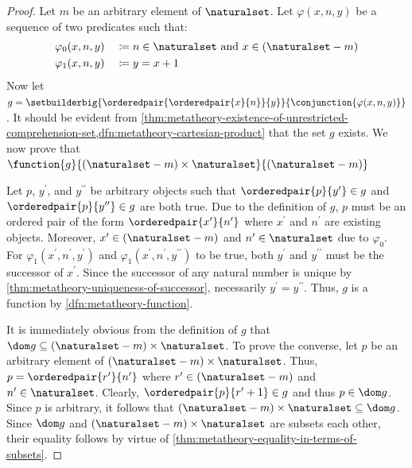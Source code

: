 \begin{proof}
    Let \( m \) be an arbitrary element of \( \naturalset \).
    Let \( \varphi(x, n, y) \) be a sequence of two predicates such that:
    \begin{alignat*}{2}
        &\varphi_{0}(x, n, y) &&\coloneq \text{\( n \in \naturalset \) and \( x \in \mleft( \naturalset - m \mright) \)}\\
        &\varphi_{1}(x, n, y) &&\coloneq \text{\( y = x + 1 \)}
    \end{alignat*}
    Now let \( g = \setbuilderbig{\orderedpair{\orderedpair{x}{n}}{y}}{\conjunction{\varphi(x, n, y)}} \).
    It should be evident from \cref{thm:metatheory-existence-of-unrestricted-comprehension-set,dfn:metatheory-cartesian-product}
    that the set \( g \) exists.
    We now prove that \( \function{g}{\mleft( \naturalset - m \mright) \times \naturalset}{\mleft( \naturalset - m \mright)} \)

    \vspace{0.3cm}
    \noindent
    Let \( p \), \( y^{\prime} \), and \( y^{\prime\prime} \) be arbitrary objects such that
    \( \orderedpair{p}{y^{\prime}} \in g \) and \( \orderedpair{p}{y^{\prime\prime}} \in g \) are both true.
    Due to the definition of \( g \), \( p \) must be an ordered pair of the form \( \orderedpair{x^{\prime}}{n^{\prime}} \)
    where \( x^{\prime} \) and \( n^{\prime} \) are existing objects.
    Moreover, \( x^{\prime} \in \mleft( \naturalset - m \mright) \) and \( n^{\prime} \in \naturalset \) due to \( \varphi_{0} \).
    For \( \varphi_{1}(x^{\prime}, n^{\prime}, y^{\prime}) \)
    and \( \varphi_{1}(x^{\prime}, n^{\prime}, y^{\prime\prime}) \) to be true,
    both \( y^{\prime} \) and \( y^{\prime\prime} \) must be the successor of \( x^{\prime} \).
    Since the successor of any natural number is unique by \cref{thm:metatheory-uniqueness-of-successor}, necessarily \( y^{\prime} = y^{\prime\prime} \).
    Thus, \( g \) is a function by \cref{dfn:metatheory-function}.

    \vspace{0.3cm}
    \noindent
    It is immediately obvious from the definition of \( g \) that \( \dom g \subseteq \mleft( \naturalset - m \mright) \times \naturalset \).
    To prove the converse, let \( p \) be an arbitrary element of \( \mleft( \naturalset - m \mright) \times \naturalset \).
    Thus, \( p = \orderedpair{r^{\prime}}{n^{\prime}} \) where \( r^{\prime} \in \mleft( \naturalset - m \mright) \) and \( n^{\prime} \in \naturalset \).
    Clearly, \( \orderedpair{p}{r^{\prime} + 1} \in g \) and thus \( p \in \dom g \).
    Since \( p \) is arbitrary, it follows that \( \mleft( \naturalset - m \mright) \times \naturalset \subseteq \dom g \).
    Since \( \dom g \) and \( \mleft( \naturalset - m \mright) \times \naturalset \) are subsets each other, their equality
    follows by virtue of \cref{thm:metatheory-equality-in-terms-of-subsets}.


\end{proof}
